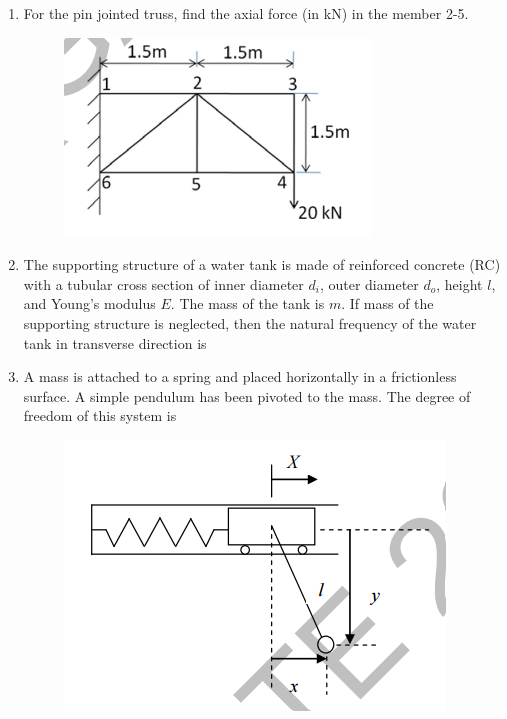 \documentclass[a4paper,10pt]{article}
\begin{document}
\begin{enumerate}
    \item For the pin jointed truss, find the axial force (in kN) in the member 2-5.
    \begin{figure}[H] \centering \includegraphics[width=0.4\columnwidth]{q6_solid.png} \caption*{} \label{fig:q6_solid} \end{figure}
    
    \hfill{}

    \item The supporting structure of a water tank is made of reinforced concrete (RC) with a tubular cross section of inner diameter $d_i$, outer diameter $d_o$, height $l$, and Young's modulus $E$. The mass of the tank is $m$. If mass of the supporting structure is neglected, then the natural frequency of the water tank in transverse direction is
    
    \hfill{}
    \begin{enumerate}[label=\Alph*)]
    \end{enumerate}

    \item A mass is attached to a spring and placed horizontally in a frictionless surface. A simple pendulum has been pivoted to the mass. The degree of freedom of this system is
    \begin{figure}[H] \centering \includegraphics[width=0.5\columnwidth]{q8_solid.png} \caption*{} \label{fig:q8_solid} \end{figure}
    

\end{enumerate}
\end{document}
